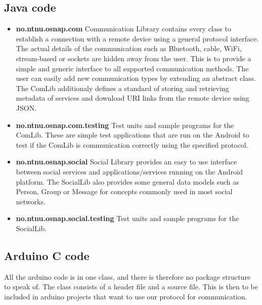 \subsection{Java code}
\begin{itemize}
	\item \textbf{no.ntnu.osnap.com}\newline
		Communication Library contains every class to establish a connection with a remote device using a general
		protocol interface. The actual details of the communication such as Bluetooth, cable, WiFi, stream-based or
		sockets are hidden away from the user. This is to provide a simple and generic interface to all supported
		communication methods. The user can easily add new communication types by extending an abstract class.
		The ComLib additionaly defines a standard of storing and retrieving metadata of services and download URI
		links from the remote device using JSON.
	\item \textbf{no.ntnu.osnap.com.testing}\newline
		Test units and sample programs for the ComLib. These are simple test applications that are run on
		the Android to test if the ComLib is communication correctly using the specified
		protocol.
	\item \textbf{no.ntnu.osnap.social}\newline
		Social Library provides an easy to use interface between social services and applications/services
		running on the Android platform. The SocialLib also provides some general data models such as Person,
		Group or Message for concepts commonly used in most social networks. 
	\item \textbf{no.ntnu.osnap.social.testing}  \newline
		Test units and sample programs for the SocialLib.
\end{itemize}

\subsection{Arduino C code}
All the arduino code is in one class, and there is therefore no package structure to speak of. The class consists of a header file and a source file. This is then to be included in arduino projects that want to use our protocol for communication.

